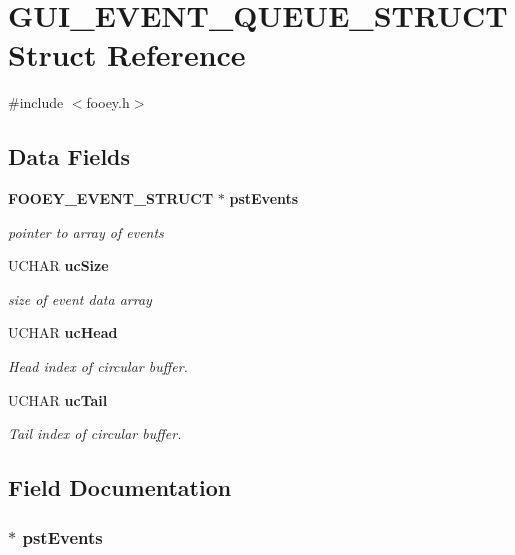 \section{GUI\_\-EVENT\_\-QUEUE\_\-STRUCT Struct Reference}
\label{struct_g_u_i___e_v_e_n_t___q_u_e_u_e___s_t_r_u_c_t}


{\ttfamily \#include $<$fooey.h$>$}\subsection*{Data Fields}
\begin{DoxyCompactItemize}
\item 
{\bf FOOEY\_\-EVENT\_\-STRUCT} $\ast$ {\bf pstEvents}
\begin{DoxyCompactList}\small\item\em pointer to array of events \item\end{DoxyCompactList}\item 
UCHAR {\bf ucSize}
\begin{DoxyCompactList}\small\item\em size of event data array \item\end{DoxyCompactList}\item 
UCHAR {\bf ucHead}
\begin{DoxyCompactList}\small\item\em Head index of circular buffer. \item\end{DoxyCompactList}\item 
UCHAR {\bf ucTail}
\begin{DoxyCompactList}\small\item\em Tail index of circular buffer. \item\end{DoxyCompactList}\end{DoxyCompactItemize}


\subsection{Field Documentation}
\subsubsection[{pstEvents}]{$\ast$ {\bf pstEvents}}\label{struct_g_u_i___e_v_e_n_t___q_u_e_u_e___s_t_r_u_c_t_ada6d4c0c28ebb750454b787c716d52ca}


